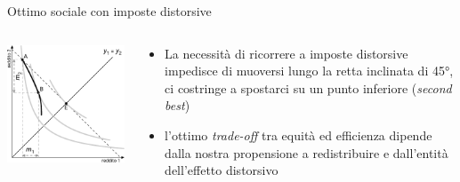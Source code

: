 \documentclass[11pt]{beamer}
\begin{document}
\begin{frame}{Ottimo sociale con imposte distorsive}
\begin{columns}
\begin{column}{.55\columnwidth}
\begin{center}
\includegraphics[width=\textwidth]{./figure/fbs-6.pdf}
\end{center}
\end{column}


\begin{column}{.45\columnwidth}
\begin{itemize}
\item La necessità di ricorrere a imposte distorsive impedisce di muoversi lungo la retta inclinata di 45°, ci costringe a spostarci su un punto inferiore (\emph{second best})
\item l'ottimo \emph{trade-off} tra equità ed efficienza dipende dalla nostra propensione a redistribuire e dall'entità dell'effetto distorsivo
\end{itemize}
\end{column}
\end{columns}
\end{frame}
\end{document}
